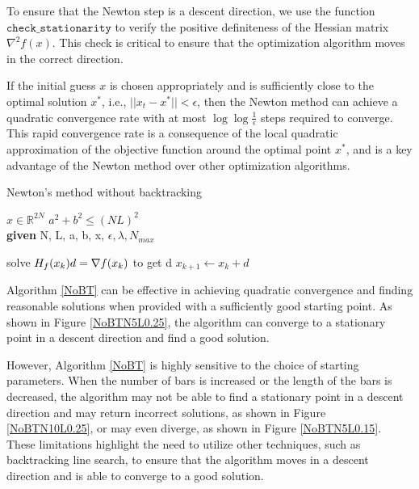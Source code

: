 \documentclass[10pt,a4paper,notitlepage,twocolumn]{article}
\begin{document}
To ensure that the Newton step is a descent direction, we use the function $\mathtt{check\_stationarity}$ to verify the positive definiteness of the Hessian matrix $\nabla^2 f(x)$. This check is critical to ensure that the optimization algorithm moves in the correct direction.

If the initial guess $x$ is chosen appropriately and is sufficiently close to the optimal solution $x^*$, i.e., $||x_t - x^*|| < \epsilon$, then the Newton method can achieve a quadratic convergence rate with at most $\log \log \frac{1}{\epsilon}$ steps required to converge. This rapid convergence rate is a consequence of the local quadratic approximation of the objective function around the optimal point $x^*$, and is a key advantage of the Newton method over other optimization algorithms. 

\begin{algorithm}[htbp]
\caption{Newton's method without backtracking}\label{alg:newton}
\label{NoBT}
\begin{algorithmic}[1]
\Require $x \in \mathbb{R}^{2N}$
\Ensure $a^2 + b^2 \leq (NL)^2$\\
\textbf{given} N, L, a, b, x, $\epsilon, \lambda, N_{max}$ 

    \State solve $H_f(x_k)d = \- \nabla f(x_k)$ to get d
    \State $x_{k+1} \gets x_k + d$
\EndWhile
\end{algorithmic}
\end{algorithm}

Algorithm \ref{NoBT} can be effective in achieving quadratic convergence and finding reasonable solutions when provided with a sufficiently good starting point. As shown in Figure \autoref{NoBTN5L0.25}, the algorithm can converge to a stationary point in a descent direction and find a good solution.

However, Algorithm \ref{NoBT} is highly sensitive to the choice of starting parameters. When the number of bars is increased or the length of the bars is decreased, the algorithm may not be able to find a stationary point in a descent direction and may return incorrect solutions, as shown in Figure \autoref{NoBTN10L0.25}, or may even diverge, as shown in Figure \autoref{NoBTN5L0.15}. These limitations highlight the need to utilize other techniques, such as backtracking line search, to ensure that the algorithm moves in a descent direction and is able to converge to a good solution.
\end{document}
